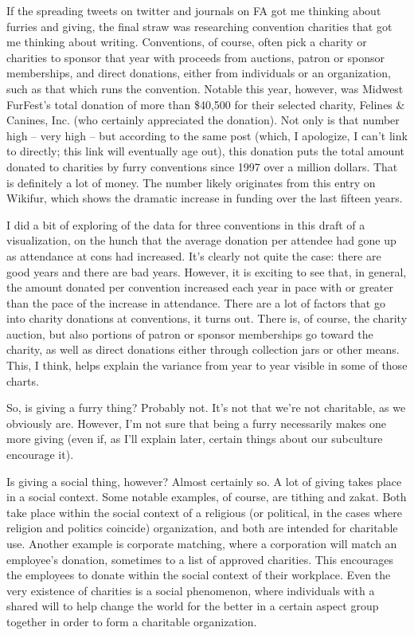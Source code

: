 If the spreading tweets on twitter and journals on FA got me thinking about furries and giving, the final straw was researching convention charities that got me thinking about writing.  Conventions, of course, often pick a charity or charities to sponsor that year with proceeds from auctions, patron or sponsor memberships, and direct donations, either from individuals or an organization, such as that which runs the convention.  Notable this year, however, was Midwest FurFest's total donation of more than \$40,500 for their selected charity, Felines \& Canines, Inc. (who certainly appreciated the donation).  Not only is that number high -- very high -- but according to the same post (which, I apologize, I can't link to directly; this link will eventually age out), this donation puts the total amount donated to charities by furry conventions since 1997 over a million dollars.  That is definitely a lot of money.  The number likely originates from this entry on Wikifur, which shows the dramatic increase in funding over the last fifteen years.

I did a bit of exploring of the data for three conventions in this draft of a visualization, on the hunch that the average donation per attendee had gone up as attendance at cons had increased.  It's clearly not quite the case: there are good years and there are bad years.  However, it is exciting to see that, in general, the amount donated per convention increased each year in pace with or greater than the pace of the increase in attendance.  There are a lot of factors that go into charity donations at conventions, it turns out.  There is, of course, the charity auction, but also portions of patron or sponsor memberships go toward the charity, as well as direct donations either through collection jars or other means.  This, I think, helps explain the variance from year to year visible in some of those charts.

So, is giving a furry thing?  Probably not.  It's not that we're not charitable, as we obviously are.  However, I'm not sure that being a furry necessarily makes one more giving (even if, as I'll explain later, certain things about our subculture encourage it).

Is giving a social thing, however?  Almost certainly so.  A lot of giving takes place in a social context.  Some notable examples, of course, are tithing and zakat.  Both take place within the social context of a religious (or political, in the cases where religion and politics coincide) organization, and both are intended for charitable use.  Another example is corporate matching, where a corporation will match an employee's donation, sometimes to a list of approved charities.  This encourages the employees to donate within the social context of their workplace.  Even the very existence of charities is a social phenomenon, where individuals with a shared will to help change the world for the better in a certain aspect group together in order to form a charitable organization.

